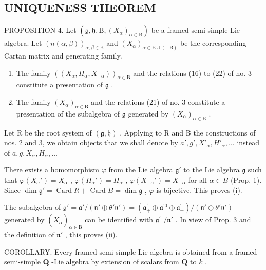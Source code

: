 \subsection{UNIQUENESS THEOREM}

PROPOSITION 4. Let \((\mathfrak{g},\mathfrak{h},\mathrm{B},(X_{\alpha})_{\alpha\in\mathrm{B}})\) be a framed semi-simple Lie algebra. Let \((n(\alpha,\beta))_{\alpha,\beta\in\mathrm{B}}\) and \((X_{\alpha})_{\alpha\in\mathrm{B}\cup(-\mathrm{B})}\) be the corresponding Cartan matrix and generating family.

\begin{enumerate}
\def\labelenumi{(\roman{enumi})}
\item
  The family \(((X_{\alpha}, H_{\alpha}, X_{-\alpha}))_{\alpha \in \mathrm{B}}\) and the relations (16) to (22) of no. 3 constitute a presentation of \(\mathfrak{g}\) .
\item
  The family \((X_{\alpha})_{\alpha \in \mathrm{B}}\) and the relations (21) of no. 3 constitute a presentation of the subalgebra of \(\mathfrak{g}\) generated by \((X_{\alpha})_{\alpha \in \mathrm{B}}\) .
\end{enumerate}

Let R be the root system of \((\mathfrak{g},\mathfrak{h})\) . Applying to R and B the constructions of nos. 2 and 3, we obtain objects that we shall denote by \(a', g', X'_{\alpha}, H'_{\alpha}, \ldots\) instead of \(a, g, X_{\alpha}, H_{\alpha}, \ldots\)

There exists a homomorphism \(\varphi\) from the Lie algebra \(\mathfrak{g}'\) to the Lie algebra \(\mathfrak{g}\) such that \(\varphi(X_{\alpha}') = X_{\alpha}\) , \(\varphi(H_{\alpha}') = H_{\alpha}\) , \(\varphi(X_{-\alpha}') = X_{-\alpha}\) for all \(\alpha \in B\) (Prop. 1). Since \(\dim \mathfrak{g}' = \operatorname{Card} R + \operatorname{Card} B = \dim \mathfrak{g}\) , \(\varphi\) is bijective. This proves (i).

The subalgebra of \(\mathfrak{g}' = \mathfrak{a}' / (\mathfrak{n}'\oplus \theta'\mathfrak{n}') = (\mathfrak{a}_+^\prime \oplus \mathfrak{a}^{\prime 0}\oplus \mathfrak{a}_-^\prime) / (\mathfrak{n}'\oplus \theta'\mathfrak{n}')\) generated by \((X_{\alpha}^{\prime})_{\alpha \in \mathrm{B}}\) can be identified with \(\mathfrak{a}_+^\prime /\mathfrak{n}'\) . In view of Prop. 3 and the definition of \(\mathfrak{n}'\) , this proves (ii).

COROLLARY. Every framed semi-simple Lie algebra is obtained from a framed semi-simple \(\mathbf{Q}\) -Lie algebra by extension of scalars from \(\mathbf{Q}\) to \(k\) .

